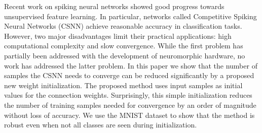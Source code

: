 
Recent work on spiking neural networks showed good progress towards unsupervised feature learning. In particular, networks called Competitive Spiking Neural Networks (CSNN) achieve reasonable accuracy in classification tasks. However, two major disadvantages limit their practical applications: high computational complexity and slow convergence. While the first problem has partially been addressed with the development of neuromorphic hardware, no work has addressed the latter problem. In this paper we show that the number of samples the CSNN needs to converge can be reduced significantly by a proposed new weight initialization. The proposed method uses input samples as initial values for the connection weights. Surprisingly, this simple initialization reduces the number of training samples needed for convergence by an order of magnitude without loss of accuracy. We use the MNIST dataset to show that the method is robust even when not all classes are seen during initialization.


